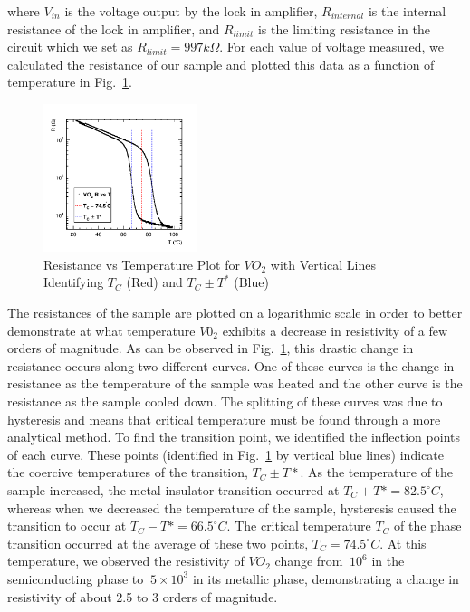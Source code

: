 \documentclass[%
 reprint,
 amsmath,amssymb,
 aps,
 pra,
]{revtex4-1}
\begin{document}
where $V_{in}$ is the voltage output by the lock in amplifier, $R_{internal}$ is the internal resistance of the lock in amplifier, and $R_{limit}$ is the limiting resistance in the circuit which we set as $R_{limit} = 997 k\Omega$. For each value of voltage measured, we calculated the resistance of our sample and plotted this data as a function of temperature in Fig.~\ref{Fig:RvT1}.

\begin{figure}[H]
	\centering
	\includegraphics[width=0.4\textwidth]{VO2_RvT_withTC.png}
	\caption{Resistance vs Temperature Plot for $VO_{2}$ with Vertical Lines Identifying $T_{C}$ (Red) and $T_{C} \pm T^{*}$ (Blue)}
	\label{Fig:RvT1}
\end{figure}

The resistances of the sample are plotted on a logarithmic scale in order to better demonstrate at what temperature $V0_{2}$ exhibits a decrease in resistivity of a few orders of magnitude. As can be observed in Fig.~\ref{Fig:RvT1}, this drastic change in resistance occurs along two different curves. One of these curves is the change in resistance as the temperature of the sample was heated and the other curve is the resistance as the sample cooled down. The splitting of these curves was due to hysteresis and means that critical temperature must be found through a more analytical method. To find the transition point, we identified the inflection points of each curve. These points (identified in Fig.~\ref{Fig:RvT1} by vertical blue lines) indicate the coercive temperatures of the transition, $T_{C} \pm T*$. As the temperature of the sample increased, the metal-insulator transition occurred at $T_{C} + T* = 82.5 ^\circ C$, whereas when we decreased the temperature of the sample, hysteresis caused the transition to occur at $T_{C} - T* = 66.5 ^\circ C$. The critical temperature $T_{C}$ of the phase transition occurred at the average of these two points, $T_{C} = 74.5^\circ C$. At this temperature, we observed the resistivity of $VO_{2}$ change from $~10^{6}$ in the semiconducting phase to $~5 \times 10^3$ in its metallic phase, demonstrating a change in resistivity of about 2.5 to 3 orders of magnitude.
\end{document}
